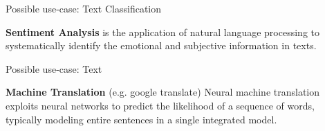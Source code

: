 \documentclass[11pt,compress,t,notes=noshow, xcolor=table]{beamer}
\begin{document}
\begin{frame} {Possible use-case: Text Classification}
\vspace{1cm}
\begin{figure}
\centering
{}
\end{figure}

\vspace{.5cm}

\textbf{Sentiment Analysis} is the application of natural language processing to systematically identify the emotional and subjective information in texts.

\end{frame}

\begin{frame} {Possible use-case: Text}
\begin{figure}
\centering
{}
\end{figure}
\textbf{Machine Translation} (e.g. google translate) 
Neural machine translation exploits neural networks to predict the likelihood of a sequence of words, typically modeling entire sentences in a single integrated model.
\end{frame}
\end{document}
